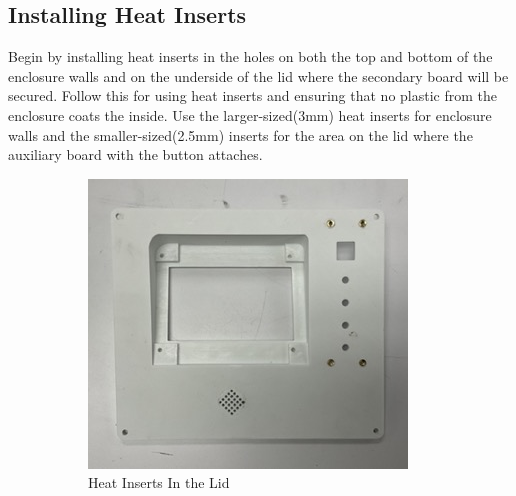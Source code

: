 
\subsection{Installing Heat Inserts}
Begin by installing heat inserts in the holes on both the top and bottom of the enclosure walls and on the underside of the lid where the secondary board will be secured. Follow this  for using heat inserts and ensuring that no plastic from the enclosure coats the inside. Use the larger-sized(3mm) heat inserts for enclosure walls and the smaller-sized(2.5mm) inserts for the area on the lid where the auxiliary board with the button attaches.
\begin{figure}[H]
        \centering
        \begin{subfigure}{.45\textwidth}
            \includegraphics[width=\textwidth]{graphics/Empty Lid.jpeg}
            \caption{Heat Inserts In the Lid}
            \label{fig:Lid Heat Inserts}
        \end{subfigure}
        \begin{subfigure}{.45\textwidth}

\end{subfigure}
\end{figure}
